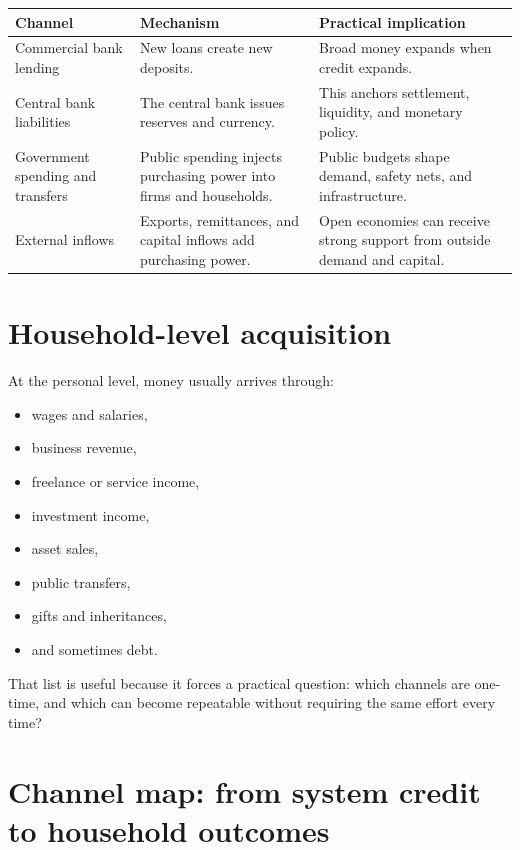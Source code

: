 \documentclass[11pt,openany]{book}
\begin{document}
\begin{center}
\begin{tabularx}{\textwidth}{>{\raggedright\arraybackslash}p{}X>{\raggedright\arraybackslash}p{}}
\toprule
\textbf{Channel} & \textbf{Mechanism} & \textbf{Practical implication} \\
\midrule
Commercial bank lending & New loans create new deposits. & Broad money expands when credit expands. \\
Central bank liabilities & The central bank issues reserves and currency. & This anchors settlement, liquidity, and monetary policy. \\
Government spending and transfers & Public spending injects purchasing power into firms and households. & Public budgets shape demand, safety nets, and infrastructure. \\
External inflows & Exports, remittances, and capital inflows add purchasing power. & Open economies can receive strong support from outside demand and capital. \\
\bottomrule
\end{tabularx}
\end{center}

\section{Household-level acquisition}

At the personal level, money usually arrives through:

\begin{itemize}
  \item wages and salaries,
  \item business revenue,
  \item freelance or service income,
  \item investment income,
  \item asset sales,
  \item public transfers,
  \item gifts and inheritances,
  \item and sometimes debt.
\end{itemize}

That list is useful because it forces a practical question: which channels are one-time, and which can become repeatable without requiring the same effort every time?

\section{Channel map: from system credit to household outcomes}
\end{document}
